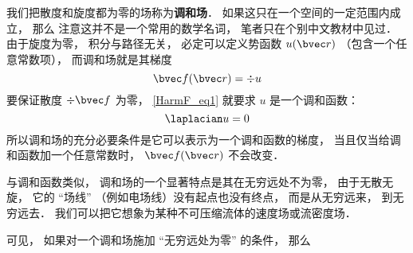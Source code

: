 
\begin{issues}
\issueDraft
\end{issues}


我们把散度和旋度都为零的场称为\textbf{调和场}． 如果这只在一个空间的一定范围内成立， 那么 注意这并不是一个常用的数学名词， 笔者只在个别中文教材中见过． 由于旋度为零， 积分与路径无关， 必定可以定义势函数 $u(\bvec r)$ （包含一个任意常数项）， 而调和场就是其梯度
\begin{equation}\label{HarmF_eq1}
\bvec f(\bvec r) = \div u
\end{equation}
要保证散度 $\div \bvec f$ 为零， \autoref{HarmF_eq1} 就要求 $u$ 是一个调和函数：
\begin{equation}
\laplacian u = 0
\end{equation}
所以调和场的充分必要条件是它可以表示为一个调和函数的梯度， 当且仅当给调和函数加一个任意常数时， $\bvec f(\bvec r)$ 不会改变．

与调和函数类似， 调和场的一个显著特点是其在无穷远处不为零， 由于无散无旋， 它的 “场线” （例如电场线）没有起点也没有终点， 而是从无穷远来， 到无穷远去． 我们可以把它想象为某种不可压缩流体的速度场或流密度场．

可见， 如果对一个调和场施加 “无穷远处为零” 的条件， 那么
